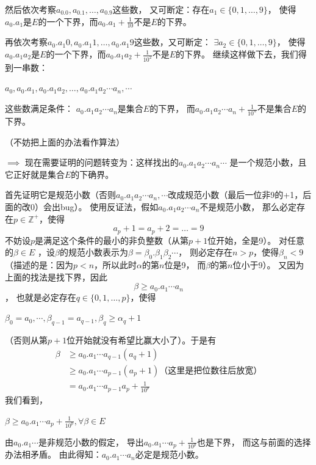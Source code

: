 \documentclass[12pt,a4paper,oneside]{ctexbook}
\begin{document}
然后依次考察$a_0.0, a_0.1, \dots, a_0.9$这些数，
又可断定：存在$a_1\in \{0,1,\dots,9\}$，
使得$a_0.a_1$是$E$的一个下界，而$a_0.a_1+\frac{1}{10}$不是$E$的下界。

再依次考察$a_0.a_{1}0,a_0.a_{1}1, \dots ,a_0.a_{1}9$这些数，又可断定：
$\exists a_2\in \{0,1,\dots,9\}$，
使得$a_0.a_1a_2$是$E$的一个下界，而$a_0.a_1a_2+\frac{1}{10^2}$不是$E$的下界。
继续这样做下去，我们得到一串数：
\begin{center}
$a_0, a_0.a_1, a_0.a_1a_2, \dots, a_0.a_1a_2\cdots a_n,\cdots$
\end{center}

这些数满足条件：
$a_0.a_1a_2\cdots a_n$是集合$E$的下界，
而$a_0.a_1a_2\cdots a_{n}+\frac{1}{10^n}$不是集合$E$的下界。

（不妨把上面的办法看作算法）

$\implies$ 现在需要证明的问题转变为：这样找出的$a_0.a_1a_2\cdots a_n\cdots$
是一个规范小数，且它正好就是集合$E$的下确界。

首先证明它是规范小数（否则$a_0.a_1a_2\cdots a_n,\cdots$改成规范小数（最后一位非9的+1，后面的改0）会出bug）。
使用反证法，假如$a_0.a_1a_2\cdots a_n$不是规范小数，
那么必定存在$p\in \mathbb{Z}^+$，使得
\[a_p+1 = a_p + 2 = \dots = 9\]
不妨设$p$是满足这个条件的最小的非负整数（从第$p+1$位开始，全是9）。
对任意的$\beta\in E$
，设$\beta$的规范小数表示为$\beta = \beta_0.\beta_1\beta_2\cdots$，
则必定存在$n>p$，使得$\beta_n < 9$（描述的是：因为$p<n$，所以此时$\alpha$的第$n$位是9，
而$\beta$的第$n$位小于9）。
又因为上面的找法是找下界，因此\[\beta \geq a_0.a_1\cdots a_n\]，
也就是必定存在$q \in \{0, 1, \dots, p\}$，使得

\begin{center}

$\beta_0 = a_0,\cdots ,\beta_{q-1} = a_{q-1},\beta_q \geq \alpha_q+1$
\end{center}
（否则从第$p+1$位开始就没有希望比赢大小了）。于是有
\begin{align*}
\beta &\geq a_0.a_1\cdots a_{q-1}(a_q+1)\\
        &\geq a_0.a_1\cdots a_{p-1}(a_p+1) \text{（这里是把位数往后放宽）}\\
        &=  a_0.a_1\cdots a_{p-1}a_p+\frac{1}{10^p}
\end{align*}
我们看到，
\begin{center}
$\beta \geq a_0.a_1\cdots a_p + \frac{1}{10^p}, \forall \beta \in E$
\end{center}

由$a_0.a_1\cdots$是非规范小数的假定，
导出$a_0.a_1\cdots a_p + \frac{1}{10^p}$也是下界，
而这与前面的选择办法相矛盾。
由此得知：$a_0.a_1\cdots a_n$必定是规范小数。\\
\end{document}
